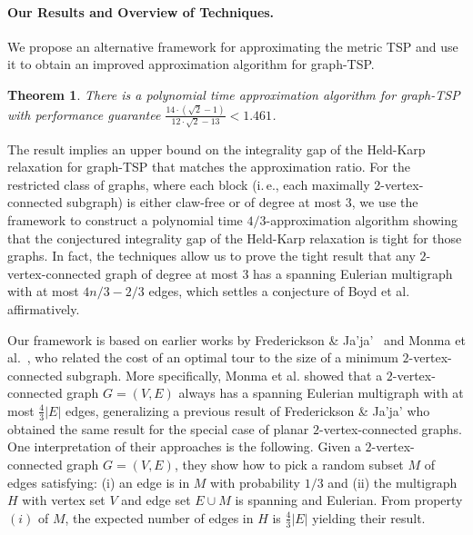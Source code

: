 \documentclass[letterpaper,11pt]{article}
\newtheorem{theorem}{Theorem}[section]
\newcommand{\TSP}{graph-TSP\xspace}
\begin{document}
\paragraph{Our Results and Overview of Techniques.}
    We propose an alternative framework for approximating the metric
    TSP and use it to obtain  an improved approximation
    algorithm for \TSP.
    \begin{theorem}\label{thm:approximationratio}
      There is a polynomial time approximation algorithm for \TSP with
      performance guarantee $\frac{14\cdot ( \sqrt{2}-1)}{12\cdot
        \sqrt{2}-13} < 1.461$.
    \end{theorem}
    The result implies an upper bound on the integrality gap of the Held-Karp
    relaxation for \TSP that matches the approximation ratio.
    For the restricted class of graphs, where each block (i.\,e., each
    maximally 2-vertex-connected subgraph) is either claw-free or of
    degree at most $3$, we use the framework to construct a polynomial
    time $4/3$-approximation algorithm showing that the conjectured
    integrality gap of the Held-Karp relaxation is tight for those
    graphs. In fact, the techniques allow us to prove the tight result
    that any $2$-vertex-connected graph of degree at most $3$ has a
    spanning Eulerian multigraph with at most $4n/3 - 2/3$ edges, which
    settles a conjecture of Boyd et al.~\cite{BSSS11} affirmatively.

    Our framework is based on earlier works by Frederickson \&
    Ja'ja'~\cite{FJJ89} and Monma et al.~\cite{MMP90}, who related the
    cost of an optimal tour to the size of a minimum $2$-vertex-connected
    subgraph.  More specifically, Monma et al. showed that a
    $2$-vertex-connected graph $G=(V,E)$ always has a spanning Eulerian
    multigraph with at most $\frac{4}{3} |E|$ edges, generalizing a
    previous result of Frederickson \& Ja'ja' who obtained
    the same result for the special case of planar $2$-vertex-connected
    graphs.
    One interpretation of their approaches is the following.  Given a
    $2$-vertex-connected graph $G=(V,E)$, they show how to pick a random
    subset $M$ of edges satisfying: (i) an edge is in $M$ with probability
    $1/3$ and (ii) the multigraph $H$ with vertex set $V$ and edge set $E
    \cup M$ is spanning and Eulerian. From property $(i)$ of
    $M$, the expected number of edges in $H$ is $\frac{4}{3} |E|$ yielding
    their result.
\end{document}
